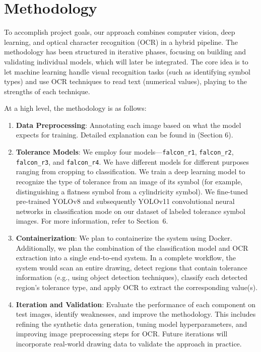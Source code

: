 \documentclass[11pt,a4paper]{article}
\begin{document}
\section{Methodology}
To accomplish project goals, our approach combines computer vision, deep learning, and optical character recognition (OCR) in a hybrid pipeline. The methodology has been structured in iterative phases, focusing on building and validating individual models, which will later be integrated. The core idea is to let machine learning handle visual recognition tasks (such as identifying symbol types) and use OCR techniques to read text (numerical values), playing to the strengths of each technique. 

At a high level, the methodology is as follows:
\begin{enumerate}
    \item \textbf{Data Preprocessing}: Annotating each image based on what the model expects for training. Detailed explanation can be found in (Section 6).
    \item \textbf{Tolerance Models}: We employ four models—\texttt{falcon\_r1}, \texttt{falcon\_r2}, \texttt{falcon\_r3}, and \texttt{falcon\_r4}. We have different models for different purposes ranging from cropping to classification. We train a deep learning model to recognize the type of tolerance from an image of its symbol (for example, distinguishing a flatness symbol from a cylindricity symbol). We fine-tuned pre-trained YOLOv8 and subsequently YOLOv11 convolutional neural networks in classification mode on our dataset of labeled tolerance symbol images. For more information, refer to Section~6.
    \item \textbf{Containerization}: We plan to containerize the system using Docker. Additionally, we plan the combination of the classification model and OCR extraction into a single end-to-end system. In a complete workflow, the system would scan an entire drawing, detect regions that contain tolerance information (e.g., using object detection techniques), classify each detected region's tolerance type, and apply OCR to extract the corresponding value(s).
    \item \textbf{Iteration and Validation}: Evaluate the performance of each component on test images, identify weaknesses, and improve the methodology. This includes refining the synthetic data generation, tuning model hyperparameters, and improving image preprocessing steps for OCR. Future iterations will incorporate real-world drawing data to validate the approach in practice.
\end{enumerate}
\end{document}
